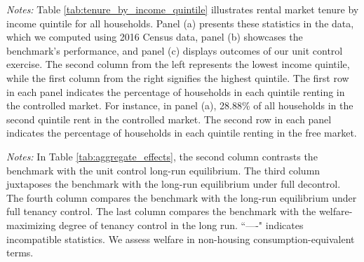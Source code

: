 \documentclass[parskip=full]{article}
\newenvironment{fignote2}[1]
{
\par
\medskip
\begin{minipage}{#1}
\footnotesize
}
{
\end{minipage}
}
\begin{document}
\begin{table}[H]
    \centering
    \caption{Rental market tenure by income quintile (all households)}
    \vspace{-0.5cm}
    \label{tab:tenure_by_income_quintile}    
    
    \vspace{-0.45cm}
    \begin{fignote2}{0.66\textwidth}
      \textit{Notes:} Table \ref{tab:tenure_by_income_quintile} illustrates rental market tenure by income quintile for all households. Panel (a) presents these statistics in the data, which we computed using 2016 Census data, panel (b) showcases the benchmark's performance, and panel (c) displays outcomes of our unit control exercise. The second column from the left represents the lowest income quintile, while the first column from the right signifies the highest quintile. The first row in each panel indicates the percentage of households in each quintile renting in the controlled market. For instance, in panel (a), 28.88\% of all households in the second quintile rent in the controlled market. The second row in each panel indicates the percentage of households in each quintile renting in the free market.  
    \end{fignote2}
\end{table}

\begin{table}[H]
    \centering
    \caption{Aggregate effects generated by changes in rent-control policy}
    \vspace{-0.5cm}
    \label{tab:aggregate_effects}
    
    \vspace{-0.45cm}
    \begin{fignote2}{1.02\textwidth}
      \textit{Notes:} In Table \ref{tab:aggregate_effects}, the second column contrasts the benchmark with the unit control long-run equilibrium. The third column juxtaposes the benchmark with the long-run equilibrium under full decontrol. The fourth column compares the benchmark with the long-run equilibrium under full tenancy control. The last column compares the benchmark with the welfare-maximizing degree of tenancy control in the long run. ``—-" indicates incompatible statistics. We assess welfare in non-housing consumption-equivalent terms.
    \end{fignote2}
\end{table}
\end{document}
